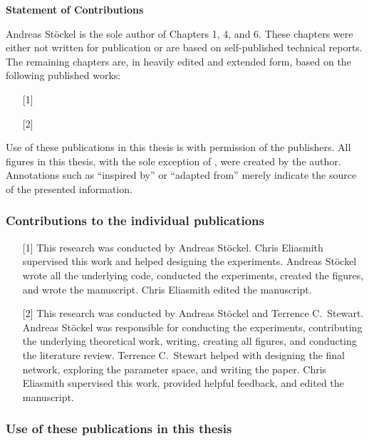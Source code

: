 {}
\begin{center}\textbf{Statement of Contributions}\end{center}

Andreas Stöckel is the sole author of Chapters 1, 4, and 6.
These chapters were either not written for publication or are based on self-published technical reports.
The remaining chapters are, in heavily edited and extended form, based on the following published works:

\begin{enumerate}
	\item[{[1]}] 
	\item[{[2]}] 
\end{enumerate}

\noindent Use of these publications in this thesis is with permission of the publishers.
All figures in this thesis, with the sole exception of , were created by the author.
Annotations such as \enquote{inspired by} or \enquote{adapted from} merely indicate the source of the presented information.

\subsubsection{Contributions to the individual publications}

\begin{enumerate}
	\item[{[1]}] This research was conducted by Andreas Stöckel.
	Chris Eliasmith supervised this work and helped designing the experiments.
	Andreas Stöckel wrote all the underlying code, conducted the experiments, created the figures, and wrote the manuscript.
	Chris Eliasmith edited the manuscript.
	\item[{[2]}] This research was conducted by Andreas Stöckel and Terrence C.~Stewart.
	Andreas Stöckel was responsible for conducting the experiments, contributing the underlying theoretical work, writing, creating all figures, and conducting the literature review.
	Terrence C.~Stewart helped with designing the final network, exploring the parameter space, and writing the paper.
	Chris Eliasmith supervised this work, provided helpful feedback, and edited the manuscript.
\end{enumerate}

\subsubsection{Use of these publications in this thesis}

